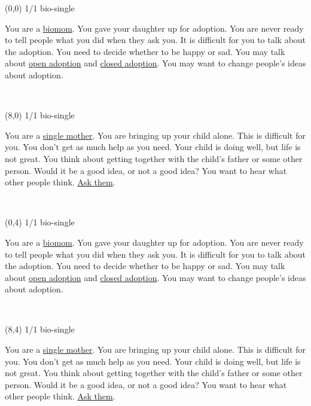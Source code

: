 \documentclass[a4paper]{article}
\newcommand{\mycard}[5]{%
	\vspace{0.1cm}
	\small #1 #2
	\par
	\parbox[t][6.7cm][c]{9.5cm}{%
	\hspace{0.1cm} \Large#3\\
	\normalsize#4 #5
	}
}
\begin{document}
\selectfont

\begin{textblock}{8}(0,0)
\mycard{1/1}{bio-single}{\parbox{9.0cm}{
You are a \ul{biomom}. You gave your daughter up for adoption. You are never ready to tell people what you did when they ask you. It is difficult for you to talk about the adoption. You need to decide whether to be happy or sad. You may talk about \ul{open adoption} and \ul{closed adoption}. You may want to change people's ideas about adoption.
}}{}{} 
\end{textblock}

\begin{textblock}{8}(8,0)
\mycard{1/1}{bio-single}{\parbox{9.0cm}{
You are a \ul{single mother}. You are bringing up your child alone. This is difficult for you. You don't get as much help as you need. Your child is doing well, but life is not great. You think about getting together with the child's father or some other person. Would it be a good idea, or not a good idea? You want to hear what other people think. \ul{Ask them}.
}}{}{} 
\end{textblock}

\begin{textblock}{8}(0,4)
\mycard{1/1}{bio-single}{\parbox{9.0cm}{
You are a \ul{biomom}. You gave your daughter up for adoption. You are never ready to tell people what you did when they ask you. It is difficult for you to talk about the adoption. You need to decide whether to be happy or sad. You may talk about \ul{open adoption} and \ul{closed adoption}. You may want to change people's ideas about adoption.
}}{}{} 
\end{textblock}

\begin{textblock}{8}(8,4)
\mycard{1/1}{bio-single}{\parbox{9.0cm}{
You are a \ul{single mother}. You are bringing up your child alone. This is difficult for you. You don't get as much help as you need. Your child is doing well, but life is not great. You think about getting together with the child's father or some other person. Would it be a good idea, or not a good idea? You want to hear what other people think. \ul{Ask them}.
}}{}{} 
\end{textblock}
\end{document}
